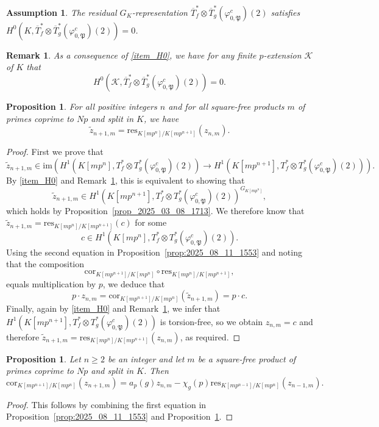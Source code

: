 \documentclass{amsart}
\numberwithin{equation}{section}
\newtheorem{proposition}[theorem]{Proposition}
\newtheorem{remark}[theorem]{Remark}
\newtheorem{assumption}[theorem]{Assumption}
\newcommand{\frk}{\mathfrak}
\begin{document}
\begin{assumption}
    \label{ass:irred}
    The residual $G_K$-representation $\overline{T}_f^\ast\otimes \overline{T}_g^\ast(\varphi_{0,\frk{P}}^c)(2)$ satisfies $H^0(K,\overline{T}_f^\ast\otimes \overline{T}_g^\ast(\varphi_{0,\frk{P}}^c)(2))=0$.
\end{assumption}

\begin{remark}\label{rk:irred}
    As a consequence of \eqref{item_H0}, we have for any finite $p$-extension $\mathcal{K}$ of $K$ that
    \[
    H^0(\mathcal{K},\overline{T}_f^\ast\otimes \overline{T}_g^\ast(\varphi_{0,\frk{P}}^c)(2))=0.
    \]
\end{remark}

\begin{proposition}
\label{prop:2025_08_11_1554}
    For all positive integers $n$ and for all square-free products $m$ of primes coprime to $Np$ and split in $K$, we have
    \[
    \tilde{z}_{n+1,m}=\mathrm{res}_{K[mp^n]/K[mp^{n+1}]}(z_{n,m}).
    \]
\end{proposition}
\begin{proof}
First we prove that
\[
\tilde{z}_{n+1,m}\in \mathrm{im}\left(H^1(K[mp^n],T_f^\ast\otimes T_g^\ast(\varphi_{0,\frk{P}}^c)(2))\rightarrow H^1(K[mp^{n+1}],T_f^\ast\otimes T_g^\ast(\varphi_{0,\frk{P}}^c)(2))\right).
\]
By \eqref{item_H0}  and Remark~\ref{rk:irred}, this is equivalent to showing that
\[
\tilde{z}_{n+1,m}\in H^1(K[mp^{n+1}],T_f^\ast\otimes T_g^\ast(\varphi_{0,\frk{P}}^c)(2))^{G_{K[mp^n]}},
\]
which holds by Proposition~\ref{prop_2025_03_08_1713}. We therefore know that $\tilde{z}_{n+1,m}=\mathrm{res}_{K[mp^n]/K[mp^{n+1}]}(c)$ for some
\[
c\in H^1(K[mp^n],T_f^\ast\otimes T_g^\ast(\varphi_{0,\frk{P}}^c)(2)).
\]
Using the second equation in Proposition~\ref{prop:2025_08_11_1553} and noting that the composition
\[
\mathrm{cor}_{K[mp^{n+1}]/K[mp^{n}]}\circ\mathrm{res}_{K[mp^n]/K[mp^{n+1}]},
\]
equals multiplication by $p$, we deduce that
\[
p \cdot z_{n,m} =\mathrm{cor}_{K[mp^{n+1}]/K[mp^n]}(\tilde{z}_{n+1,m})=p\cdot c.
\]
Finally, again by \eqref{item_H0}  and Remark~\ref{rk:irred}, we infer that $H^1(K[mp^{n+1}],T_f^\ast\otimes T_g^\ast(\varphi_{0,\frk{P}}^c)(2))$ is torsion-free, so we obtain $z_{n,m}=c$ and therefore $\tilde{z}_{n+1,m}=\mathrm{res}_{K[mp^n]/K[mp^{n+1}]}(z_{n,m})$, as required.
\end{proof}


\begin{proposition}
\label{prop_thm_2025_07_03_1627}
    Let $n\geq 2$ be an integer and let $m$ be a square-free product of primes coprime to $Np$ and split in $K$. Then
    \[
    \mathrm{cor}_{K[mp^{n+1}]/K[mp^n]}(z_{n+1,m})=a_p(g)z_{n,m}-\chi_g(p)\mathrm{res}_{K[mp^{n-1}]/K[mp^n]}(z_{n-1,m}).
    \]
\end{proposition}
\begin{proof}
    This follows by combining the first equation in Proposition~\ref{prop:2025_08_11_1553} and Proposition~\ref{prop:2025_08_11_1554}.
\end{proof}
\end{document}
